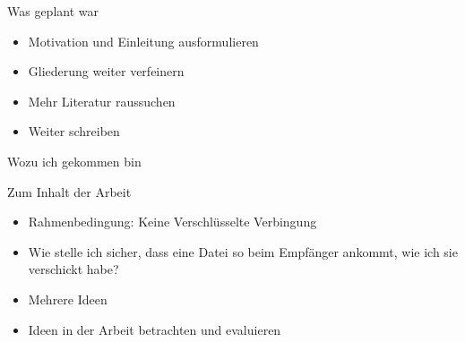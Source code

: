 \documentclass{beamer}
\institute{Universität Hamburg -- Fachbereich Informatik -- Abschlussarbeiten Seminar}
\date{\today}
\title{\myTitle}
\author{\myName}
\begin{document}
{
    \frame{
        \titlepage
    }
}

\begin{frame}{Was geplant war}
  \begin{itemize}
    \item Motivation und Einleitung ausformulieren
    \item Gliederung weiter verfeinern
    \item Mehr Literatur raussuchen
    \item Weiter schreiben
  \end{itemize}
\end{frame}

\begin{frame}{Wozu ich gekommen bin}
\end{frame}

\begin{frame}{Zum Inhalt der Arbeit}
  \begin{itemize}
    \item Rahmenbedingung: Keine Verschlüsselte Verbingung
    \item Wie stelle ich sicher, dass eine Datei so beim Empfänger ankommt, wie ich sie verschickt habe?
    \item Mehrere Ideen
    \item Ideen in der Arbeit betrachten und evaluieren
  \end{itemize}
\end{frame}
\end{document}
